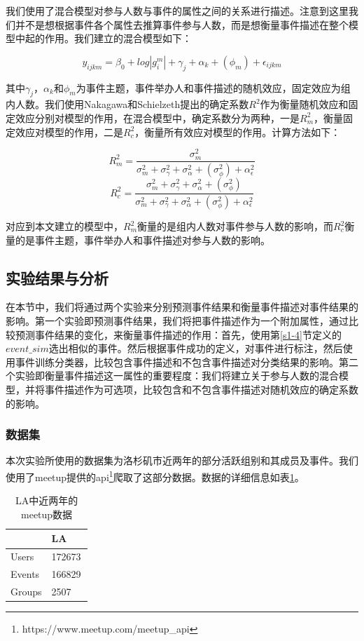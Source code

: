 我们使用了混合模型对参与人数与事件的属性之间的关系进行描述。注意到这里我们并不是想根据事件各个属性去推算事件参与人数，而是想衡量事件描述在整个模型中起的作用。我们建立的混合模型如下：

\begin{equation}
y_{ijkm}=\beta_0+log|g_i^m|+\gamma_j+\alpha_k+ (\phi_m) +\epsilon_{ijkm}
\end{equation}

其中\(\gamma_j\)，\(\alpha_k\)和\(\phi_m\)为事件主题，事件举办人和事件描述的随机效应，固定效应为组内人数。我们使用Nakagawa和Schielzeth\citep{nakagawa_ageneralandsimplemethodforobtaining_2013}提出的确定系数\(R^2\)作为衡量随机效应和固定效应分别对模型的作用，在混合模型中，确定系数分为两种，一是\(R_m^2\)，衡量固定效应对模型的作用，二是\(R_c^2\)，衡量所有效应对模型的作用。计算方法如下：

\begin{equation}
R_m^2=\frac{\sigma_m^2}{\sigma_m^2+\sigma_\gamma^2+\sigma_\alpha^2+(\sigma_\phi^2)+\alpha_\epsilon^2}
\end{equation}
\begin{equation}
R_c^2=\frac{\sigma_m^2+\sigma_\gamma^2+\sigma_\alpha^2+(\sigma_\phi^2)}{\sigma_m^2+\sigma_\gamma^2+\sigma_\alpha^2+(\sigma_\phi^2)+\alpha_\epsilon^2}
\end{equation}

对应到本文建立的模型中，\(R_m^2\)衡量的是组内人数对事件参与人数的影响，而\(R_c^2\)衡量的是事件主题，事件举办人和事件描述对参与人数的影响。

\subsection{实验结果与分析}
在本节中，我们将通过两个实验来分别预测事件结果和衡量事件描述对事件结果的影响。第一个实验即预测事件结果，我们将把事件描述作为一个附加属性，通过比较预测事件结果的变化，来衡量事件描述的作用：首先，使用第\ref{s1-4}节定义的\(event\_sim\)选出相似的事件。然后根据事件成功的定义，对事件进行标注，然后使用事件训练分类器，比较包含事件描述和不包含事件描述对分类结果的影响。第二个实验即衡量事件描述这一属性的重要程度：我们将建立关于参与人数的混合模型，并将事件描述作为可选项，比较包含和不包含事件描述对随机效应的确定系数的影响。

\subsubsection{数据集}
本次实验所使用的数据集为洛杉矶市近两年的部分活跃组别和其成员及事件。我们使用了meetup提供的api\footnote{https://www.meetup.com/meetup\_api}爬取了这部分数据。数据的详细信息如表\ref{t1-1}。
\begin{table}[htbp] 
  \centering  
  \caption{\label{t1-1}LA中近两年的meetup数据}
    \begin{tabular*}{\linewidth}{p{0.5\linewidth}p{0.5\linewidth}}
\toprule
    & LA \\
\midrule
    Users & 172673\\
    Events & 166829\\
    Groups & 2507\\
\bottomrule
    \end{tabular*}
\end{table}

